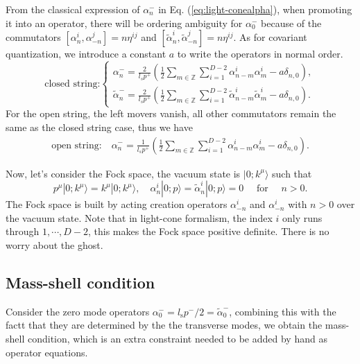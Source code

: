 \documentclass[graybox,envcountchap,sectrefs]{svmono}
\begin{document}
From the classical expression of $\alpha^-_{n}$ in Eq. (\ref{eq:light-conealpha}), when promoting it into an operator, there will be ordering ambiguity for  $\alpha^-_{0}$ because of the commutators $[\alpha_{n}^{i},\alpha_{-n}^{j}]=n\eta^{ij}$ and $[\tilde{\alpha}_{n}^{i},\tilde{\alpha}_{-n}^{j}]=n\eta^{ij}$. As for covariant quantization, we introduce a constant $a$  to write the operators in normal order.
\begin{equation}
\boxed{
\text{closed string:}\begin{cases}
\alpha_{n}^{-}=\frac{2}{l_{s} p^{+}}\left(\frac{1}{2}  \sum_{m\in \mathbb{Z}} \sum_{i=1}^{D-2}\alpha_{n-m}^{i} \alpha_{m}^{i}-a\delta_{n,0} \right),\\
\tilde{\alpha}_{n}^{-}=\frac{2}{l_{s} p^{+}} \left(\frac{1}{2} \sum_{m\in \mathbb{Z}} \sum_{i=1}^{D-2} \tilde{\alpha}_{n-m}^{i} \tilde{\alpha}_{m}^{i}-a\delta_{n,0}\right). 
\end{cases}}
\end{equation}
For the open string, the left movers vanish, all other commutators remain the same as the closed string case, thus we have
\begin{align}
\boxed{
\text{open string:} \quad\alpha_{n}^{-}=\frac{1}{l_{s} p^{+}}\left(\frac{1}{2}\sum_{m\in \mathbb{Z}}  \sum_{i=1}^{D-2} \alpha_{n-m}^{i} \alpha_{m}^{i}-a\delta_{n,0}\right).  }
\end{align}

Now, let's consider the Fock space, the vacuum state is $|0;k^{\mu}\rangle$ such that
\begin{equation}
{p}^{\mu}|0 ; k^{\mu}\rangle=k^{\mu}|0 ; k^{\mu}\rangle , \quad \alpha_{n}^{i}|0 ; p\rangle=\tilde{\alpha}_{n}^{i}|0 ; p\rangle=0 \quad \text { for } \quad n>0.
\end{equation}
The Fock space is  built by acting creation operators $\alpha_{-n}^i$ and $\alpha_{-n}^i$ with $n>0$ over the vacuum state. Note that in light-cone formalism, the index $i$ only runs through $1,\cdots,D-2$, this makes the Fock space positive definite. There is no worry about the ghost.

\subsection{Mass-shell condition}
Consider the zero mode operators $\alpha_0^-=l_{\mathrm{s}}p^-/2=\tilde{\alpha}^-_0$, combining this with the factt that they are determined by the the transverse modes, we obtain the mass-shell condition, which is an extra constraint needed to be added by hand as operator equations.
\end{document}
